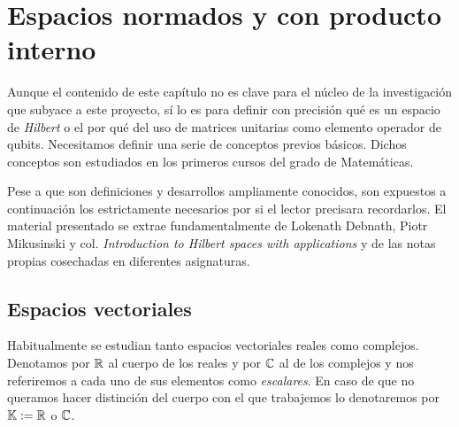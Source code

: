 \chapter{Espacios normados y con producto interno}
\label{chapter2}

Aunque el contenido de este capítulo no es clave para el núcleo de la investigación que subyace a este proyecto, sí lo es para definir con precisión qué es un espacio de \textit{Hilbert} o el por qué del uso de matrices unitarias como elemento operador de qubits. Necesitamos definir una serie de conceptos previos básicos. Dichos conceptos son estudiados en los primeros cursos del grado de Matemáticas.

Pese a que son definiciones y desarrollos ampliamente conocidos, son expuestos a continuación los estrictamente necesarios por si el lector precisara recordarlos. El material presentado se extrae fundamentalmente de Lokenath Debnath, Piotr Mikusinski y col. \textit{Introduction to Hilbert spaces with applications} y de las notas propias cosechadas en diferentes asignaturas.

\section{Espacios vectoriales}

Habitualmente se estudian tanto espacios vectoriales reales como complejos. Denotamos por $\mathbb{R}$ al cuerpo de los reales y por $\mathbb{C}$ al de los complejos y nos referiremos a cada uno de sus elementos como \textit{escalares}. En caso de que no queramos hacer distinción del cuerpo con el que trabajemos lo denotaremos por $\mathbb{K}:=\mathbb{R}$ o $\mathbb{C}$.

